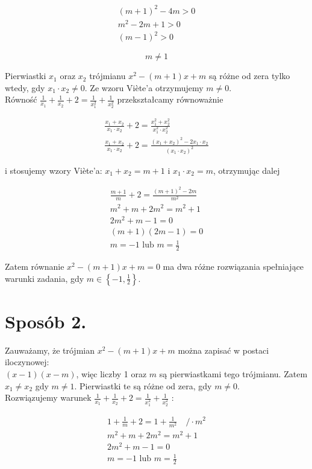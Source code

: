 \documentclass[10pt]{article}
\begin{document}
$$
\begin{gathered}
(m+1)^{2}-4 m>0 \\
m^{2}-2 m+1>0 \\
(m-1)^{2}>0
\end{gathered}
$$

$$
m \neq 1
$$

Pierwiastki $x_{1}$ oraz $x_{2}$ trójmianu $x^{2}-(m+1) x+m$ są różne od zera tylko wtedy, gdy $x_{1} \cdot x_{2} \neq 0$. Ze wzoru Viète'a otrzymujemy $m \neq 0$.\\
Równość $\frac{1}{x_{1}}+\frac{1}{x_{2}}+2=\frac{1}{x_{1}^{2}}+\frac{1}{x_{2}^{2}}$ przekształcamy równoważnie

$$
\begin{gathered}
\frac{x_{1}+x_{2}}{x_{1} \cdot x_{2}}+2=\frac{x_{1}^{2}+x_{2}^{2}}{x_{1}^{2} \cdot x_{2}^{2}} \\
\frac{x_{1}+x_{2}}{x_{1} \cdot x_{2}}+2=\frac{\left(x_{1}+x_{2}\right)^{2}-2 x_{1} \cdot x_{2}}{\left(x_{1} \cdot x_{2}\right)^{2}}
\end{gathered}
$$

i stosujemy wzory Viète'a: $x_{1}+x_{2}=m+1$ i $x_{1} \cdot x_{2}=m$, otrzymując dalej

$$
\begin{gathered}
\frac{m+1}{m}+2=\frac{(m+1)^{2}-2 m}{m^{2}} \\
m^{2}+m+2 m^{2}=m^{2}+1 \\
2 m^{2}+m-1=0 \\
(m+1)(2 m-1)=0 \\
m=-1 \text { lub } m=\frac{1}{2}
\end{gathered}
$$

Zatem równanie $x^{2}-(m+1) x+m=0$ ma dwa różne rozwiązania spełniające warunki zadania, gdy $m \in\left\{-1, \frac{1}{2}\right\}$.

\section*{Sposób 2.}
Zauważamy, że trójmian $x^{2}-(m+1) x+m$ można zapisać w postaci iloczynowej:\\
$(x-1)(x-m)$, więc liczby 1 oraz $m$ są pierwiastkami tego trójmianu. Zatem $x_{1} \neq x_{2}$ gdy $m \neq 1$. Pierwiastki te są różne od zera, gdy $m \neq 0$.\\
Rozwiązujemy warunek $\frac{1}{x_{1}}+\frac{1}{x_{2}}+2=\frac{1}{x_{1}^{2}}+\frac{1}{x_{2}^{2}}$ :

$$
\begin{gathered}
1+\frac{1}{m}+2=1+\frac{1}{m^{2}} \quad / \cdot m^{2} \\
m^{2}+m+2 m^{2}=m^{2}+1 \\
2 m^{2}+m-1=0 \\
m=-1 \text { lub } m=\frac{1}{2}
\end{gathered}
$$
\end{document}
